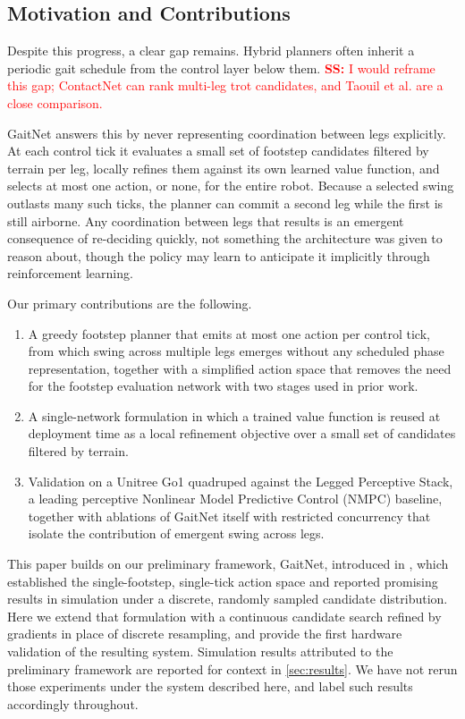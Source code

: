 \subsection{Motivation and Contributions}
Despite this progress, a clear gap remains. Hybrid planners often
inherit a periodic gait schedule from the control layer below them.
\textcolor{red}{\textbf{SS:} I would reframe this gap; ContactNet can
rank multi-leg trot candidates, and Taouil et al. are a close
comparison.}

GaitNet answers this by never representing coordination between legs
explicitly. At each control tick it evaluates a small set of
footstep candidates filtered by terrain per leg, locally refines them
against its own learned value function, and selects at most one
action, or none, for the entire robot. Because a selected swing
outlasts many such ticks, the planner can commit a second leg while
the first is still airborne. Any coordination between legs that
results is an emergent consequence of re-deciding quickly, not
something the architecture was given to reason about, though the
policy may learn to anticipate it implicitly through reinforcement
learning.

Our primary contributions are the following.
\begin{enumerate}
  \item A greedy footstep planner that emits at most one action per
    control tick, from which swing across multiple legs emerges
    without any scheduled phase representation, together with a
    simplified action space that removes the need for the footstep
    evaluation network with two stages used in prior work.
  \item A single-network formulation in which a trained value
    function is reused at deployment time as a local refinement
    objective over a small set of candidates filtered by terrain.
  \item Validation on a Unitree Go1 quadruped against the Legged
    Perceptive Stack, a leading perceptive Nonlinear Model Predictive
    Control (NMPC) baseline, together with ablations of GaitNet
    itself with restricted concurrency that isolate the contribution
    of emergent swing across legs.
\end{enumerate}

This paper builds on our preliminary framework, GaitNet, introduced in
\cite{Sullivan2025}, which established the single-footstep,
single-tick action space and reported promising results in simulation
under a discrete, randomly sampled candidate distribution. Here we
extend that formulation with a continuous candidate search refined by
gradients in place of discrete resampling, and provide the first
hardware validation of the resulting system. Simulation results
attributed to the preliminary framework are reported for context in
\autoref{sec:results}. We have not rerun those experiments under the
system described here, and label such results accordingly throughout.
